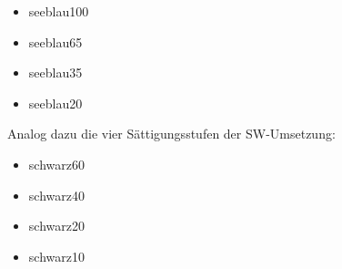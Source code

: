 \documentclass[../thesis.tex]{subfiles}
\begin{document}
\begin{itemize}
\item \textcolor{seeblau100}{seeblau100}
\item \textcolor{seeblau65}{seeblau65}
\item \textcolor{seeblau35}{seeblau35}
\item \textcolor{seeblau20}{seeblau20}\\
\end{itemize}

\noindent Analog dazu die vier Sättigungsstufen der SW-Umsetzung:

\begin{itemize}
\item \textcolor{schwarz60}{schwarz60}
\item \textcolor{schwarz40}{schwarz40}
\item \textcolor{schwarz20}{schwarz20}
\item \textcolor{schwarz10}{schwarz10}\\
\end{itemize}




%
%
%
%
%
%
%
%
%
%
%
%
%
%
\end{document}
